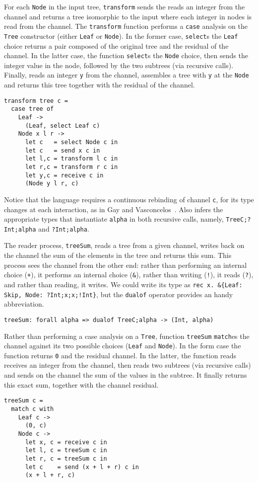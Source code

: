 For each \lstinline|Node| in the input tree, \lstinline|transform|
sends the reads an integer from the channel and returns a tree
isomorphic to the input where each integer in nodes is read from the
channel. 
%
The \lstinline|transform| function performs a \lstinline|case|
analysis on the \lstinline|Tree| constructor (either \lstinline|Leaf|
or \lstinline|Node|). In the former case, \lstinline|select|s the
\lstinline|Leaf| choice returns a pair composed of the original tree
and the residual of the channel. In the latter case, the function
\lstinline|select|s the \lstinline|Node| choice, then sends the
integer value in the node, followed by the two subtrees (via recursive
calls). Finally, reads an integer \lstinline|y| from the channel,
assembles a tree with \lstinline|y| at the \lstinline|Node| and
returns this tree together with the residual of the channel.
%
\begin{lstlisting}
transform tree c =
  case tree of
    Leaf ->
      (Leaf, select Leaf c)
    Node x l r ->
      let c   = select Node c in
      let c   = send x c in
      let l,c = transform l c in
      let r,c = transform r c in
      let y,c = receive c in
      (Node y l r, c)
\end{lstlisting}

Notice that the language requires a continuous rebinding of channel
\lstinline|c|, for its type changes at each interaction, as in Gay and
Vasconcelos~\cite{DBLP:journals/jfp/GayV10}. Also \freest{} infers the
appropriate types that instantiate \lstinline|alpha| in both recursive
calls, namely, \lstinline|TreeC;?Int;alpha| and
\lstinline|?Int;alpha|.

The reader process, \lstinline|treeSum|, reads a tree from a given
channel, writes back on the channel the sum of the elements in the
tree and returns this sum. This process sees the channel from the
other end: rather than performing an internal choice (\lstinline|+|),
it performs an internal choice (\lstinline|&|), rather than writing
(\lstinline|!|), it reads (\lstinline|?|), and rather than reading, it
writes. We could write its type as
\lstinline|rec x. &{Leaf: Skip, Node: ?Int;x;x;!Int}|,
but the \lstinline|dualof| operator provides an handy abbreviation.
%
\begin{lstlisting}
treeSum: forall alpha => dualof TreeC;alpha -> (Int, alpha)
\end{lstlisting}

Rather than performing a case analysis on a \lstinline|Tree|, function
\lstinline|treeSum| \lstinline|match|es the channel against its two
possible choices (\lstinline|Leaf| and \lstinline|Node|). In the form
case the function returns \lstinline|0| and the residual channel. In
the latter, the function reads receives an integer from the channel,
then reads two subtrees (via recursive calls) and sends on the channel
the sum of the values in the subtree. It finally returns this exact
sum, together with the channel residual.
%
\begin{lstlisting}
treeSum c =
  match c with
    Leaf c ->
      (0, c)
    Node c ->
      let x, c = receive c in
      let l, c = treeSum c in
      let r, c = treeSum c in
      let c    = send (x + l + r) c in
      (x + l + r, c)
\end{lstlisting}

